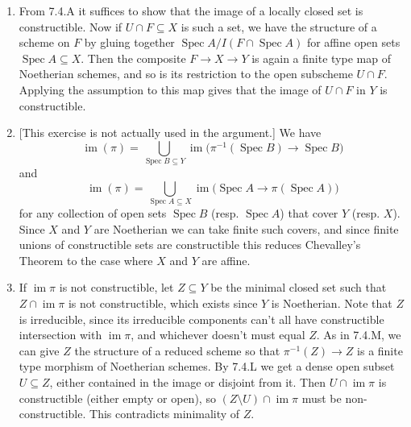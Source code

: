 \documentclass{report}
\DeclareMathOperator{\im}{im}
\DeclareMathOperator{\Spec}{Spec}
\begin{document}
\begin{enumerate}[label=\textbf{7.4.\Alph*.}]
	\item From 7.4.A it suffices to show that the image of a locally closed
	      set is constructible. Now if $U\cap F\subseteq X$ is such a set, we
	      have the structure of a scheme on $F$ by gluing together
	      $\Spec A/I(F\cap\Spec A)$ for affine open sets $\Spec A\subseteq X$.
	      Then the composite $F\to X\to Y$ is again a finite type map of
	      Noetherian schemes, and so is its restriction to the open subscheme
	      $U\cap F$. Applying the assumption to this map gives that the image of
	      $U\cap F$ in $Y$ is constructible.

	      \item{} [This exercise is not actually used in the argument.] We have
	      \begin{equation*}
		      \im(\pi) = \bigcup_{\Spec B\subseteq Y}\im\bigl(\pi^{-1}(\Spec B)\to\Spec B\bigr)
	      \end{equation*}
	      and
	      \begin{equation*}
		      \im(\pi) = \bigcup_{\Spec A\subseteq X}\im\bigl(\Spec A\to\pi(\Spec A)\bigr)
	      \end{equation*}
	      for any collection of open sets $\Spec B$ (resp. $\Spec A$) that cover
	      $Y$ (resp. $X$). Since $X$ and $Y$ are Noetherian we can take finite
	      such covers, and since finite unions of constructible sets are
	      constructible this reduces Chevalley's Theorem to the case where $X$
	      and $Y$ are affine.

	\item If $\im\pi$ is not constructible, let $Z\subseteq Y$ be the minimal
	      closed set such that $Z\cap\im\pi$ is not constructible, which exists
	      since $Y$ is Noetherian. Note that $Z$ is irreducible, since its
	      irreducible components can't all have constructible intersection with
	      $\im\pi$, and whichever doesn't must equal $Z$. As in 7.4.M, we can
	      give $Z$ the structure of a reduced scheme so that $\pi^{-1}(Z)\to Z$
	      is a finite type morphism of Noetherian schemes. By 7.4.L we get a
	      dense open subset $U\subseteq Z$, either contained in the image or
	      disjoint from it. Then $U\cap\im\pi$ is constructible (either empty or
	      open), so $(Z\setminus U)\cap\im\pi$ must be non-constructible. This
	      contradicts minimality of $Z$.


\end{enumerate}
\end{document}
